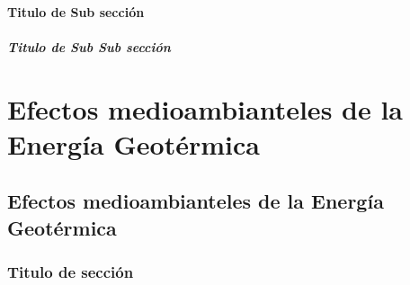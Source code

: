 \documentclass[a4paper,12pt]{report}
\begin{document}
\subsection{Titulo de Sub sección}
\subsubsection{Titulo de Sub Sub sección}


\part{Efectos medioambianteles de la Energía Geotérmica}
\chapter{Efectos medioambianteles de la Energía Geotérmica}
\section{Titulo de sección}
\end{document}
